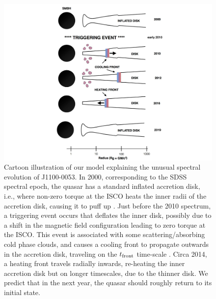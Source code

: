 \documentclass[a4paper,fleqn,usenatbib]{mnras}
\begin{document}
\begin{figure}
  \includegraphics[width=15.4cm, trim=0.0cm 0.0cm 0.0cm 0.0cm, clip]
  {../plots/models/cartoon_v4.pdf}
  \centering
  \caption[]{
    Cartoon illustration of our model explaining the unusual spectral
evolution of J1100-0053. In 2000, corresponding to the SDSS spectral
epoch, the quasar has a standard inflated accretion disk, i.e., where
non-zero torque at the ISCO heats the inner radii of the accretion
disk, causing it to puff up \citep[e.g.,][]{Zimmerman2005}. Just
before the 2010 spectrum, a triggering event occurs that deflates the
inner disk, possibly due to a shift in the magnetic field
configuration leading to zero torque at the ISCO.  This event is
associated with some scattering/absorbing cold phase clouds, and
causes a cooling front to propagate outwards in the accretion disk,
traveling on the $t_{\rm front}$ time-scale \citep[see
also][]{Hameury2009}.  Circa 2014, a heating front travels radially
inwards, re-heating the inner accretion disk but on longer timescales,
due to the thinner disk. We predict that in the next year, the quasar
should roughly return to its initial state.}
  \label{fig:J110057_diskmodel}
\end{figure}



\end{document}
